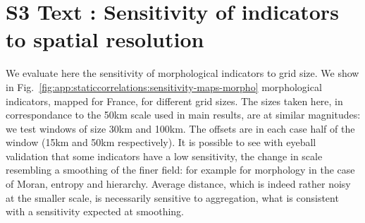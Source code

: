 



\section*{S3 Text : Sensitivity of indicators to spatial resolution}

We evaluate here the sensitivity of morphological indicators to grid size. We show in Fig.~\ref{fig:app:staticcorrelations:sensitivity-maps-morpho} morphological indicators, mapped for France, for different grid sizes. The sizes taken here, in correspondance to the 50km scale used in main results, are at similar magnitudes: we test windows of size 30km and 100km. The offsets are in each case half of the window (15km and 50km respectively). It is possible to see with eyeball validation that some indicators have a low sensitivity, the change in scale resembling a smoothing of the finer field: for example for morphology in the case of Moran, entropy and hierarchy. Average distance, which is indeed rather noisy at the smaller scale, is necessarily sensitive to aggregation, what is consistent with a sensitivity expected at smoothing. 


